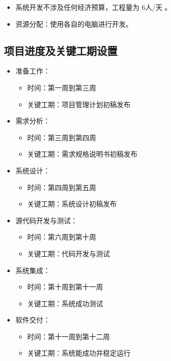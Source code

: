 \documentclass[
  hyperref, a4paper]{ctexart}
\providecommand{\tightlist}{%
  \setlength{\itemsep}{0pt}\setlength{\parskip}{0pt}}
\begin{document}
\begin{itemize}
\tightlist
\item
  系统开发不涉及任何经济预算，工程量为 6人/天 。
\item
  资源分配：使用各自的电脑进行开发。
\end{itemize}

\hypertarget{ux9879ux76eeux8fdbux5ea6ux53caux5173ux952eux5de5ux671fux8bbeux7f6e-1}{%
\subsection{项目进度及关键工期设置}\label{ux9879ux76eeux8fdbux5ea6ux53caux5173ux952eux5de5ux671fux8bbeux7f6e-1}}

\begin{itemize}
\tightlist
\item
  准备工作：

  \begin{itemize}
  \tightlist
  \item
    时间：第一周到第三周
  \item
    关键工期：项目管理计划初稿发布
  \end{itemize}
\item
  需求分析：

  \begin{itemize}
  \tightlist
  \item
    时间：第三周到第四周
  \item
    关键工期：需求规格说明书初稿发布
  \end{itemize}
\item
  系统设计：

  \begin{itemize}
  \tightlist
  \item
    时间：第四周到第五周
  \item
    关键工期：系统设计初稿发布
  \end{itemize}
\item
  源代码开发与测试：

  \begin{itemize}
  \tightlist
  \item
    时间：第六周到第十周
  \item
    关键工期：代码开发与测试
  \end{itemize}
\item
  系统集成：

  \begin{itemize}
  \tightlist
  \item
    时间：第十周到第十一周
  \item
    关键工期：系统成功测试
  \end{itemize}
\item
  软件交付：

  \begin{itemize}
  \tightlist
  \item
    时间：第十一周到第十二周
  \item
    关键工期：系统能成功并稳定运行
  \end{itemize}
\end{itemize}
\end{document}
